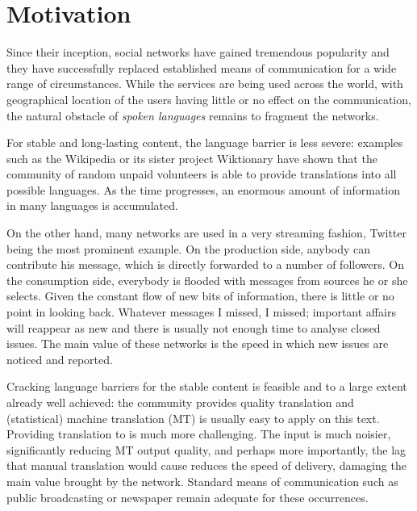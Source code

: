 \documentclass[11pt]{article}
\begin{document}
%

\section{Motivation}
\label{motiv}

Since their inception, social networks have gained tremendous popularity and
they have successfully replaced established means of communication for a wide
range of circumstances. While the services are being used across the world, with
geographical location of the users having little or no effect on the
communication, the
natural obstacle of \emph{spoken languages} remains to fragment the networks.

For stable and long-lasting content, the language barrier is less severe:
examples such as the Wikipedia or its sister project Wiktionary have shown that
the community of random unpaid volunteers is able to provide translations into
all possible languages. As the time progresses, an enormous amount of
information in many languages is accumulated.

On the other hand, many networks are used in a very streaming fashion, Twitter
being the most prominent example. On the production side, anybody can contribute
his message, which is
directly forwarded to a number of followers. On the consumption side, everybody
is flooded with messages from sources he or she selects. Given the constant flow
of new bits of information, there is little or no point in looking back.
Whatever messages I missed, I missed; important affairs will reappear as new
 and there is usually not enough time to analyse closed issues. The main
value of these networks is the speed in which new issues are noticed and
reported.

Cracking language barriers for the stable content is feasible and to a large
extent already well achieved: the community provides quality translation and
(statistical) machine translation (MT) is usually easy to apply on this
 text.
Providing translation to  is much more challenging.
The input is much noisier, significantly reducing MT output quality, and perhaps
more importantly, the lag that manual translation would cause reduces the speed
of delivery, damaging the main value brought by the network. Standard means of
communication such as public broadcasting or newspaper remain adequate for these
occurrences.
\end{document}
